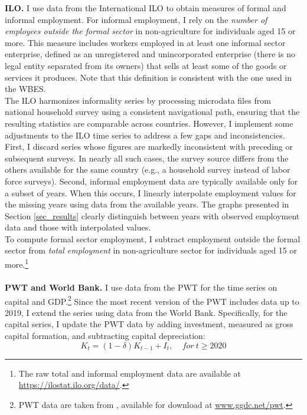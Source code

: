 \documentclass[letterpaper, 12pt]{article}
\begin{document}
\vspace{3mm}
\noindent
\textbf{ILO.} I use data from the International ILO to obtain measures of formal and informal employment. For informal employment, I rely on the \textit{number of employees outside the formal sector} in non-agriculture for individuals aged 15 or more. This measure includes workers employed in at least one informal sector enterprise, defined as an unregistered and unincorporated enterprise (there is no legal entity separated from its owners) that sells at least some of the goods or services it produces. Note that this definition is consistent with the one used in the WBES. 
\\The ILO harmonizes informality series by processing  microdata files from national household survey using a consistent navigational path, ensuring that the resulting statistics are comparable across countries.
However, I implement some adjustments to the ILO time series to address a few gaps and inconsistencies. First, I discard series whose figures are markedly inconsistent with preceding or subsequent surveys. In nearly all such cases, the survey source differs from the others available for the same country (e.g., a household survey instead of labor force surveys). Second, informal employment data are typically available only for a subset of years. When this occurs, I linearly interpolate employment values for the missing years using data from the available years. The graphs presented in Section \ref{sec_results} clearly distinguish between years with observed employment data and those with interpolated values.
\\To compute formal sector employment, I subtract employment outside the formal sector from \textit{total employment} in non-agriculture sector for individuals aged 15 or more.\footnote{The raw total and informal employment data are available at \href{https://ilostat.ilo.org/data/}{https://ilostat.ilo.org/data/}.}  
\\
\\
\noindent
\textbf{PWT and World Bank.}
I use data from the PWT for the time series on capital and GDP.\footnote{PWT data are taken from \textcolor{blue}{\cite{feenstraetal2015}}, available for download at \href{www.ggdc.net/pwt}{www.ggdc.net/pwt}.} Since the most recent version of the PWT includes data up to 2019, I extend the series using data from the World Bank. Specifically, for the capital series, I update the PWT data by adding investment, measured as gross capital formation, and subtracting capital depreciation:
$$K_{t}=(1-\delta)K_{t-1}+I_t, \ \ \ \ \ for \ t\geq2020$$
\end{document}
